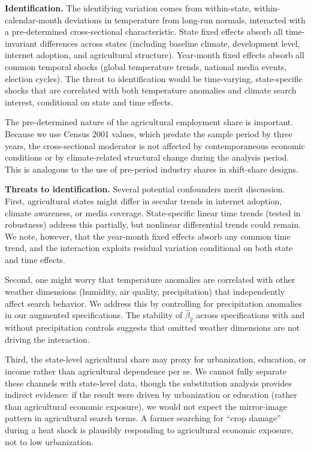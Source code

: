 \documentclass[12pt]{article}
\begin{document}
\textbf{Identification.} The identifying variation comes from within-state, within-calendar-month deviations in temperature from long-run normals, interacted with a pre-determined cross-sectional characteristic. State fixed effects absorb all time-invariant differences across states (including baseline climate, development level, internet adoption, and agricultural structure). Year-month fixed effects absorb all common temporal shocks (global temperature trends, national media events, election cycles). The threat to identification would be time-varying, state-specific shocks that are correlated with both temperature anomalies and climate search interest, conditional on state and time effects.

The pre-determined nature of the agricultural employment share is important. Because we use Census 2001 values, which predate the sample period by three years, the cross-sectional moderator is not affected by contemporaneous economic conditions or by climate-related structural change during the analysis period. This is analogous to the use of pre-period industry shares in shift-share designs.

\textbf{Threats to identification.} Several potential confounders merit discussion. First, agricultural states might differ in secular trends in internet adoption, climate awareness, or media coverage. State-specific linear time trends (tested in robustness) address this partially, but nonlinear differential trends could remain. We note, however, that the year-month fixed effects absorb any common time trend, and the interaction exploits residual variation conditional on both state and time effects.

Second, one might worry that temperature anomalies are correlated with other weather dimensions (humidity, air quality, precipitation) that independently affect search behavior. We address this by controlling for precipitation anomalies in our augmented specifications. The stability of $\hat{\beta}_2$ across specifications with and without precipitation controls suggests that omitted weather dimensions are not driving the interaction.

Third, the state-level agricultural share may proxy for urbanization, education, or income rather than agricultural dependence per se. We cannot fully separate these channels with state-level data, though the substitution analysis provides indirect evidence: if the result were driven by urbanization or education (rather than agricultural economic exposure), we would not expect the mirror-image pattern in agricultural search terms. A farmer searching for ``crop damage'' during a heat shock is plausibly responding to agricultural economic exposure, not to low urbanization.
\end{document}
